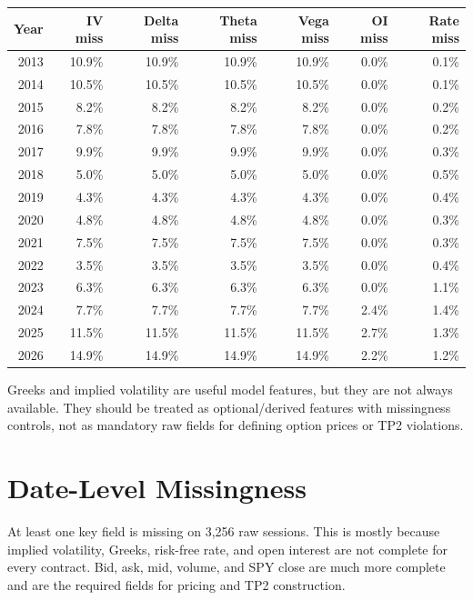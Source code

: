 \documentclass[11pt]{article}
\begin{document}
\begingroup
\scriptsize
\begin{longtable}{rrrrrrr}
\toprule
Year & IV miss & Delta miss & Theta miss & Vega miss & OI miss & Rate miss \\
\midrule
2013 & 10.9\% & 10.9\% & 10.9\% & 10.9\% & 0.0\% & 0.1\% \\
2014 & 10.5\% & 10.5\% & 10.5\% & 10.5\% & 0.0\% & 0.1\% \\
2015 & 8.2\% & 8.2\% & 8.2\% & 8.2\% & 0.0\% & 0.2\% \\
2016 & 7.8\% & 7.8\% & 7.8\% & 7.8\% & 0.0\% & 0.2\% \\
2017 & 9.9\% & 9.9\% & 9.9\% & 9.9\% & 0.0\% & 0.3\% \\
2018 & 5.0\% & 5.0\% & 5.0\% & 5.0\% & 0.0\% & 0.5\% \\
2019 & 4.3\% & 4.3\% & 4.3\% & 4.3\% & 0.0\% & 0.4\% \\
2020 & 4.8\% & 4.8\% & 4.8\% & 4.8\% & 0.0\% & 0.3\% \\
2021 & 7.5\% & 7.5\% & 7.5\% & 7.5\% & 0.0\% & 0.3\% \\
2022 & 3.5\% & 3.5\% & 3.5\% & 3.5\% & 0.0\% & 0.4\% \\
2023 & 6.3\% & 6.3\% & 6.3\% & 6.3\% & 0.0\% & 1.1\% \\
2024 & 7.7\% & 7.7\% & 7.7\% & 7.7\% & 2.4\% & 1.4\% \\
2025 & 11.5\% & 11.5\% & 11.5\% & 11.5\% & 2.7\% & 1.3\% \\
2026 & 14.9\% & 14.9\% & 14.9\% & 14.9\% & 2.2\% & 1.2\% \\
\bottomrule
\end{longtable}
\endgroup

Greeks and implied volatility are useful model features, but they are not
always available. They should be treated as optional/derived features with
missingness controls, not as mandatory raw fields for defining option prices or
TP2 violations.

\section*{Date-Level Missingness}

At least one key field is missing on 3,256
raw sessions. This is mostly because implied volatility, Greeks, risk-free
rate, and open interest are not complete for every contract. Bid, ask, mid,
volume, and SPY close are much more complete and are the required fields for
pricing and TP2 construction.
\end{document}
